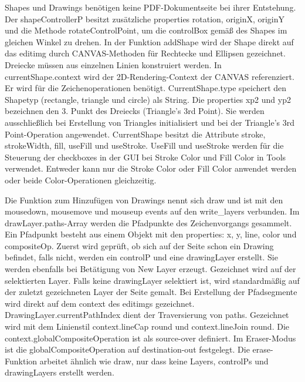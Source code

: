 \par
Shapes und Drawings benötigen keine PDF-Dokumentseite bei ihrer Entstehung. Der shapeControllerP besitzt zusätzliche properties rotation, originX, originY und die Methode rotateControlPoint, um die controlBox gemäß des Shapes im gleichen Winkel zu drehen. In der Funktion addShape wird der Shape direkt auf das editimg durch CANVAS-Methoden für Rechtecke und Ellipsen gezeichnet. Dreiecke müssen aus einzelnen Linien konstruiert werden. In currentShape.context wird der 2D-Rendering-Context der CANVAS referenziert. Er wird für die Zeichenoperationen benötigt. CurrentShape.type speichert den Shapetyp (rectangle, triangle und circle) als String. Die properties xp2 und yp2 bezeichnen den 3. Punkt des Dreiecks (Triangle's 3rd Point). Sie werden ausschließlich bei Erstellung von Triangles initialisiert und bei der Triangle's 3rd Point-Operation angewendet. CurrentShape besitzt die Attribute stroke, strokeWidth, fill, useFill und useStroke. UseFill und useStroke werden für die Steuerung der checkboxes in der GUI bei Stroke Color und Fill Color in Tools verwendet. Entweder kann nur die Stroke Color oder Fill Color anwendet werden oder beide Color-Operationen gleichzeitig. 
\par 
Die Funktion zum Hinzufügen von Drawings nennt sich draw und ist mit den mousedown, mousemove und mouseup events auf den write\_layers verbunden. Im drawLayer.paths-Array werden die Pfadpunkte des Zeichenvorgangs gesammelt. Ein Pfadpunkt besteht aus einem Objekt mit den properties:  x, y, line, color und compositeOp. Zuerst wird geprüft, ob sich auf der Seite schon ein Drawing befindet, falls nicht, werden ein controlP und eine drawingLayer erstellt. Sie werden ebenfalls bei Betätigung von New Layer erzeugt. Gezeichnet wird auf der selektierten Layer. Falls keine drawingLayer selektiert ist, wird standardmäßig auf der zuletzt gezeichneten Layer der Seite gemalt. Bei Erstellung der Pfadsegmente wird direkt auf dem context des editimgs gezeichnet. DrawingLayer.currentPathIndex dient der Traversierung von paths. Gezeichnet wird mit dem Linienstil context.lineCap round und context.lineJoin round. Die context.globalCompositeOperation ist als source-over definiert. Im Eraser-Modus ist die globalCompositeOperation auf destination-out festgelegt. Die erase-Funktion arbeitet ähnlich wie draw, nur dass keine Layers, controlPs und drawingLayers erstellt werden. 

